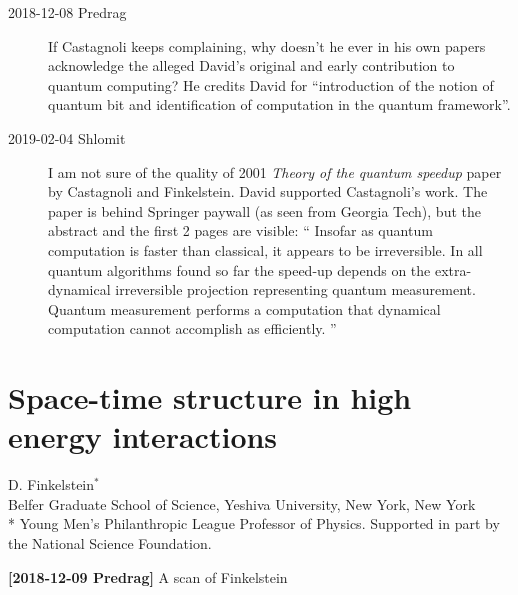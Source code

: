 \begin{description}
\item[2018-12-08 Predrag]
If Castagnoli keeps complaining, why doesn't he ever in his own papers
acknowledge the alleged David's original and early contribution to quantum
computing?
He credits David for ``introduction of the notion of
quantum bit and identification of computation in the quantum
framework''.

\item[2019-02-04 Shlomit]
I am not sure of the quality of 2001 {\em  Theory of the quantum speedup}
paper by Castagnoli and Finkelstein.
David supported Castagnoli’s work. %
The paper is behind Springer paywall (as seen from Georgia Tech), but the
abstract and the first 2 pages are visible: ``
Insofar as quantum computation is faster than classical, it appears to be
irreversible. In all quantum algorithms found so far the speed-up depends
on the extra-dynamical irreversible projection representing quantum
measurement. Quantum measurement performs a computation that dynamical
computation cannot accomplish as efficiently.
''


\end{description}

\newpage
\section{Space-time structure in high energy interactions}
\label{sect:Finkel69a}

\noindent
D. Finkelstein$^*$
\\
Belfer Graduate School
of Science, Yeshiva University, New York, New York
\\{\footnotesize
* Young Men's Philanthropic League Professor of Physics.
  Supported in part by the National Science Foundation.
  }


\medskip

\hfill{\footnotesize
{\bf [2018-12-09 Predrag]} A scan of Finkelstein 
}

\bigskip\bigskip

